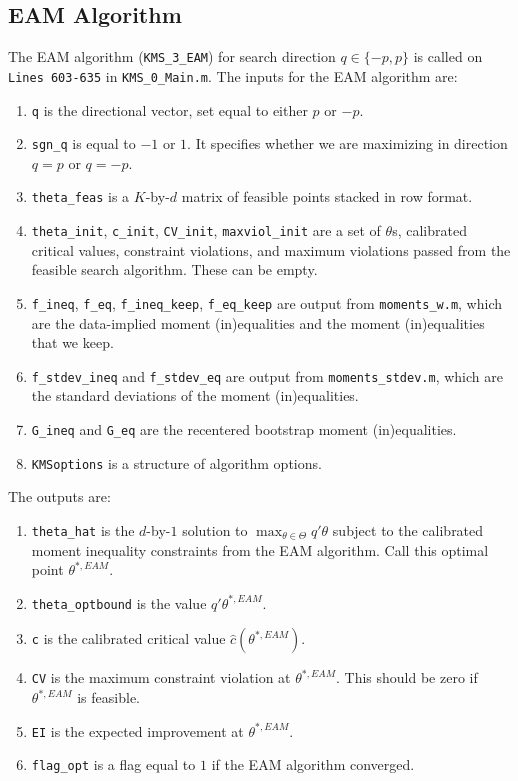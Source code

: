 \documentclass[12pt]{article}
\def\code#1{\texttt{#1}}
\begin{document}
\subsection{EAM Algorithm}\label{sec:EAM}
The EAM algorithm (\code{KMS\_3\_EAM}) for search direction $q \in \{-p,p\}$ is called on \code{Lines 603-635} in \code{KMS\_0\_Main.m}.  The inputs for the EAM algorithm are:
\begin{enumerate}
\item \code{q} is the directional vector, set equal to either $p$ or $-p$.

\item \code{sgn\_q} is equal to $-1$ or $1$.  It specifies whether we are maximizing in direction $q=p$ or $q=-p$.

\item \code{theta\_feas} is a $K$-by-$d$ matrix of feasible points stacked in row format.

\item \code{theta\_init}, \code{c\_init},  \code{CV\_init}, \code{maxviol\_init} are a set of $\theta$s, calibrated critical values,  constraint violations, and maximum violations passed from the feasible search algorithm.  These can be empty.

\item \code{f\_ineq}, \code{f\_eq}, \code{f\_ineq\_keep}, \code{f\_eq\_keep} are output from \code{moments\_w.m}, which are the data-implied moment (in)equalities and the moment (in)equalities that we keep.

\item \code{f\_stdev\_ineq} and \code{f\_stdev\_eq} are output from \code{moments\_stdev.m}, which are the standard deviations of the moment (in)equalities.

\item \code{G\_ineq} and \code{G\_eq} are the recentered bootstrap moment (in)equalities.

\item \code{KMSoptions} is a structure of algorithm options.
\end{enumerate}
The outputs are:
\begin{enumerate}
\item \code{theta\_hat} is the $d$-by-$1$ solution to $\max_{\theta \in \Theta} q'\theta$ subject to the calibrated moment inequality constraints from the EAM algorithm.  Call this optimal point $\theta^{*,EAM}$.

\item \code{theta\_optbound} is the value $q'\theta^{*,EAM}$.

\item \code{c} is the calibrated critical value $\hat c(\theta^{*,EAM})$.

\item \code{CV} is the maximum constraint violation at $\theta^{*,EAM}$.  This should be zero if $\theta^{*,EAM}$ is feasible.

\item \code{EI} is the expected improvement at $\theta^{*,EAM}$.

\item \code{flag\_opt} is a flag equal to $1$ if the EAM algorithm converged.
\end{enumerate}
\end{document}
